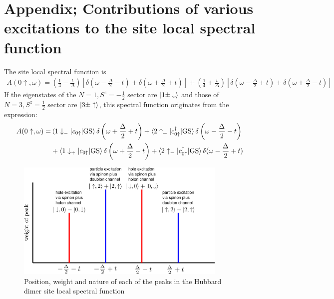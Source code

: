 \documentclass[12pt]{article}
\numberwithin{equation}{section}
\begin{document}
\section*{Appendix; Contributions of various excitations to the site local spectral function}
The site local spectral function is
\begin{equation}\begin{aligned}
	A(0\uparrow, \omega) = \left( \frac{1}{4} - \frac{t}{\Delta} \right)\left[\delta(\omega - \frac{\Delta}{2} - t) + \delta(\omega + \frac{\Delta}{2} + t)\right]\nonumber + \left( \frac{1}{4} + \frac{t}{\Delta} \right) \left[\delta(\omega - \frac{\Delta}{2} + t) + \delta(\omega + \frac{\Delta}{2} - t)\right]
\end{aligned}\end{equation}
If the eigenstates of the $N=1, S^z = - \frac{1}{2}$ sector are $\ket{1 \pm \downarrow}$ and those of $N=3, S^z = \frac{1}{2}$ sector are $\ket{3 \pm \uparrow}$, this spectral function originates from the expression:
\begin{equation}\begin{aligned}
	A(0\uparrow, \omega) =& \braket{1 \downarrow_- | c_{0 \uparrow} | \text{GS}} \delta\left(\omega + \frac{\Delta}{2} + t\right) + \braket{2 \uparrow_+ | c^\dagger_{0 \uparrow} | \text{GS}}\delta\left(\omega - \frac{\Delta}{2} - t\right) \\
			      &+ \braket{1 \downarrow_+ | c_{0 \uparrow} | \text{GS}}\delta\left(\omega + \frac{\Delta}{2} - t\right) + \braket{2 \uparrow_- | c^\dagger_{0 \uparrow} | \text{GS}}\delta(\omega - \frac{\Delta}{2} + t)
\end{aligned}\end{equation}
\begin{figure}[htpb]
	\centering
	\includegraphics[width=0.9\textwidth]{./dimer-peaks.png}
	\caption{Position, weight and nature of each of the peaks in the Hubbard dimer site local spectral function}
\end{figure}
\end{document}
